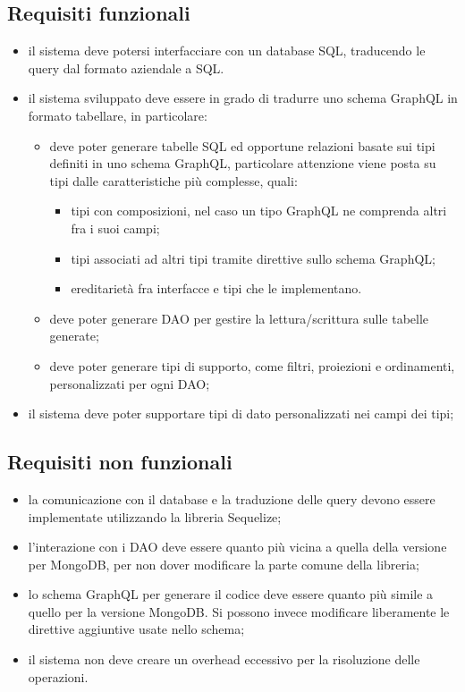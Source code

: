 \documentclass[a4paper, 12pt]{report}
\begin{document}
      \subsection{Requisiti funzionali}
        \begin{itemize}
          \item il sistema deve potersi interfacciare con un database SQL, traducendo le query dal formato aziendale a SQL.
          \item il sistema sviluppato deve essere in grado di tradurre uno schema GraphQL in formato tabellare, in particolare:
          \begin{itemize}
            \item deve poter generare tabelle SQL ed opportune relazioni basate sui tipi definiti in uno schema GraphQL, particolare attenzione viene posta su tipi dalle caratteristiche più complesse, quali:
            \begin{itemize}
              \item tipi con composizioni, nel caso un tipo GraphQL ne comprenda altri fra i suoi campi;
              \item tipi associati ad altri tipi tramite direttive sullo schema GraphQL;
              \item ereditarietà fra interfacce e tipi che le implementano.
            \end{itemize}
            \item deve poter generare DAO per gestire la lettura/scrittura sulle tabelle generate;
            \item deve poter generare tipi di supporto, come filtri, proiezioni e ordinamenti, personalizzati per ogni DAO;
          \end{itemize}
          \item il sistema deve poter supportare tipi di dato personalizzati nei campi dei tipi;
        \end{itemize}
      \subsection{Requisiti non funzionali}
        \begin{itemize}
          \item la comunicazione con il database e la traduzione delle query devono essere implementate utilizzando la libreria Sequelize;
          \item l'interazione con i DAO deve essere quanto più vicina a quella della versione per MongoDB, per non dover modificare la parte comune della libreria;
          \item lo schema GraphQL per generare il codice deve essere quanto più simile a quello per la versione MongoDB. Si possono invece modificare liberamente le direttive aggiuntive usate nello schema;
          \item il sistema non deve creare un overhead eccessivo per la risoluzione delle operazioni.
        \end{itemize}
  \newpage
  
\end{document}
